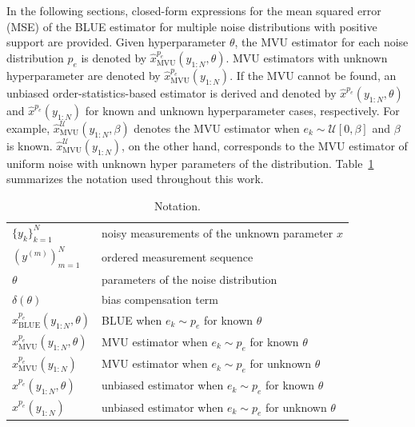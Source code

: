 \documentclass{article}
\begin{document}
In the following sections, closed-form expressions for the mean squared error (MSE) of the BLUE estimator for multiple noise distributions with positive support are provided.  Given  hyperparameter $\theta$, the MVU estimator for each noise distribution $p_e$ is denoted by $\hat{x}_{\mathrm{MVU}}^{p_e}(y_{1:N},\theta)$. MVU estimators with unknown hyperparameter are denoted by  $\hat{x}_{\mathrm{MVU}}^{p_e}(y_{1:N})$. If the MVU cannot be found, an unbiased order-statistics-based estimator is derived and denoted by $\hat{x}^{p_e}(y_{1:N},\theta)$ and $\hat{x}^{p_e}(y_{1:N})$ for known and unknown hyperparameter cases, respectively. For example, $\hat{x}^{\mathcal{U}}_{\mathrm{MVU}}(y_{1:N},\beta)$ denotes the MVU estimator when $e_k\sim\mathcal{U}[0,\beta]$ and $\beta$  is known. $\hat{x}^{\mathcal{U}}_{\mathrm{MVU}}(y_{1:N})$, on the other hand, corresponds to the MVU estimator of uniform noise with unknown hyper parameters of the distribution. Table~\ref{tbl:notation} summarizes the notation used throughout this work.
\begin{table}[]
	\centering
	\caption{Notation.}
	\begin{tabular}{l|l}
		$\{y_k\}_{k=1}^N$                                                & noisy measurements of the unknown parameter $x$                                                          \\[2mm]
		$\left(y^{(m)}\right)_{m=1}^N$                                            & ordered measurement sequence                                          \\[2mm]
		$\theta$                                        & parameters of the noise distribution                                                                     \\[2mm]
		$\delta(\theta)$                                & bias compensation term                                                                                   \\[2mm]
		$\hat{x}^{p_e}_{\mathrm{BLUE}}(y_{1:N},\theta)$ & BLUE when $e_k\sim p_e$ for known $\theta$                                            \\[2mm]
		$\hat{x}^{p_e}_{\mathrm{MVU}}(y_{1:N},\theta)$  & MVU estimator when $e_k\sim p_e$ for known $\theta$                                   \\[2mm]
		$\hat{x}^{p_e}_{\mathrm{MVU}}(y_{1:N})$              & MVU estimator when $e_k\sim p_e$ for unknown $\theta$ \\[2mm]
		$\hat{x}^{p_e}(y_{1:N},\theta)$                 & unbiased estimator when $e_k\sim p_e$ for known $\theta$                              \\[2mm]
		$\hat{x}^{p_e}(y_{1:N})$                             & unbiased estimator when $e_k\sim p_e$ for unknown $\theta$                           
	\end{tabular}
	\label{tbl:notation}
\end{table}
\end{document}
